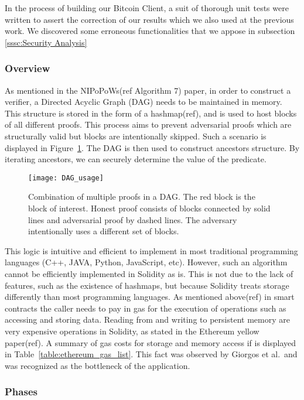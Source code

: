 In the process of building our Bitcoin Client, a suit of thorough unit tests
were written to assert the correction of our results which we also used at the
previous work. We discovered some erroneous functionalities that we appose in
subsection \ref{sssc:Security Analysis}

\subsubsection{Overview} As mentioned in the NIPoPoWs(ref Algorithm 7) paper,
in order to construct a verifier, a Directed Acyclic Graph (DAG) needs to be
maintained in memory. This structure is stored in the form of a hashmap(ref),
and is used to host blocks of all different proofs. This process aims to
prevent adversarial proofs which are structurally valid but blocks are
intentionally skipped. Such a scenario is displayed in
Figure~\ref{fig:DAG_usage}. The DAG is then used to construct ancestors
structure. By iterating ancestors, we can securely determine the value of the
predicate.

\begin{figure}[hbt]
    \centering
    \texttt{[image: DAG\_usage]}
    \caption{Combination of multiple proofs in a DAG. The red block is the
        block of interest. Honest proof consists of blocks connected by solid
        lines and adversarial proof by dashed lines. The adversary
        intentionally uses a different set of blocks.}
    \label{fig:DAG_usage}
\end{figure}

This logic is intuitive and efficient to implement in most traditional
programming languages (C++, JAVA, Python, JavaScript, etc). However, such an
algorithm cannot be efficiently implemented in Solidity as is. This is not due
to the lack of features, such as the existence of hashmaps, but because
Solidity treats storage differently than most programming languages. As
mentioned above(ref) in smart contracts the caller needs to pay in gas for the
execution of operations such as accessing and storing data. Reading from and
writing to persistent memory are very expensive operations in Solidity, as
stated in the Ethereum yellow paper(ref). A summary of gas costs for storage
and memory access if is displayed in Table~\ref{table:ethereum_gas_list}. This
fact was observed by Giorgos et al.\ and was recognized as the bottleneck of
the application.



\subsubsection{Phases}

